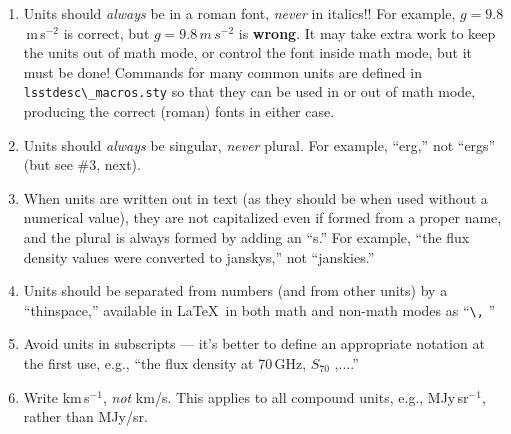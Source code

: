\documentclass[letterpaper,11pt]{article}
\begin{document}
\begin{enumerate}

\item Units should {\it always\/} be in a roman font, {\it never\/} in
italics!!  For example, $g = 9.8$\,m\,s$^{-2}$ is correct,
but $g=9.8\,m\,s^{-2}$ is
{\bf wrong}.  It may take extra work to keep the units out of math mode, or
control the font inside math mode, but it must be done!  Commands for many
common units are defined in \verb|lsstdesc\_macros.sty| so that they can be used in or out of
math mode, producing the correct (roman) fonts in either case.

\item Units should {\it always\/} be singular, {\it never\/} plural.  For
example, ``erg,'' not ``ergs'' (but see \#3, next).

\item When units are written out in text (as they should be when used without
a numerical value), they are not capitalized even if formed from a proper name,
and the plural is always formed by adding an ``s.''  For example, ``the flux
density values were converted to janskys,''  not ``janskies.''



\item Units should be separated from numbers (and from other units) by a
``thinspace,'' available in La\TeX\ in both math and non-math modes as
``\verb|\,|\,\,''  

\item Avoid units in subscripts --- it's better to define an appropriate
notation at the first use, e.g., ``the flux density at 70\,GHz,
$S_{70}$ ,$\ldots$.''

\item Write km\,s$^{-1}$, {\it not\/} km/s.  This applies to all compound
units, e.g., MJy\,sr$^{-1}$, rather than MJy/sr.


\end{enumerate}
\end{document}
